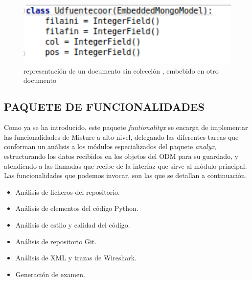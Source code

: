 \begin{figure}[H]
   \centering
   \includegraphics[width=12cm]{img/Selection_027_mongoembdoc}
   \caption{representación de un documento sin colección , embebido en otro documento}
   \label{figura:mon_emb}
\end{figure}


\subsection{PAQUETE DE FUNCIONALIDADES} 
\label{subsec:paq_functs}

Como ya se ha introducido, este paquete \textit{funtionalityx} se encarga de implementar las funcionalidades de Misture a alto nivel, delegando las diferentes tareas que conforman un análisis a los módulos especializados del paquete \textit{analyx}, estructurando los datos recibidos en los objetos del ODM para su guardado, y atendiendo a las llamadas que recibe de la interfaz que sirve al módulo principal.\\


Las funcionalidades que podemos invocar, son las que se detallan a continuación.\\

\begin{itemize}
\item Análisis de ficheros del repositorio.\\

\item Análisis de elementos del código Python.\\

\item Análisis de estilo y calidad del código.\\

\item Análisis de repositorio Git.\\

\item Análisis de XML y trazas de Wireshark.\\

\item Generación de examen.
\end{itemize}


